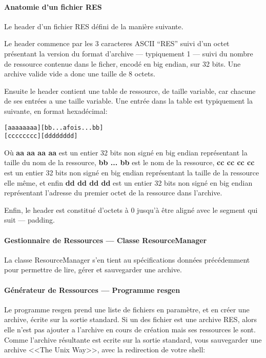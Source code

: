 \documentclass[11pt, a4paper, titlepage]{article}
\begin{document}
\paragraph{Anatomie d'un fichier RES\\}

Le header d'un fichier RES défini de la manière suivante.

Le header commence par les 3 caracteres ASCII ``RES'' suivi d'un octet présentant la version du format d'archive --- typiquement 1 --- suivi du nombre de
ressource contenue dans le ficher, encodé en big endian, sur 32 bits.
Une archive valide vide a donc une taille de 8 octets.

Ensuite le header contient une table de ressource, de taille variable, car chacune de ses entrées a une taille variable.
Une entrée dans la table est typiquement la suivante, en format hexadécimal:

\begin{alltt}
[ aa aa aa aa ] [ bb {... a fois ...} bb]
[ cc cc cc cc ] [ dd dd dd dd ]
\end{alltt}

Où \textbf{aa aa aa aa} est un entier 32 bits non signé en big endian représentant la taille du nom de la ressource, \textbf{bb ... bb} est le nom de la ressource,
\textbf{cc cc cc cc} est un entier 32 bits non signé en big endian représentant la taille de la ressource elle même, et enfin \textbf{dd dd dd dd} est
un entier 32 bits non signé en big endian représentant l'adresse du premier octet de la ressource dans l'archive.

Enfin, le header est constitué d'octets à 0 jusqu'à être aligné avec le segment qui suit --- padding.

\paragraph{Gestionnaire de Ressources --- Classe ResourceManager\\}

La classe ResourceManager s'en tient au spécifications données précédemment pour permettre de lire, gérer et sauvegarder une archive. 

\paragraph{Générateur de Ressources  --- Programme resgen\\}

Le programme resgen prend une liste de fichiers en paramètre, et en créer une archive, écrite sur la sortie standard.
Si un des fichier est une archive RES, alors elle n'est pas ajouter a l'archive en cours de création mais ses ressources le sont.
Comme l'archive résultante est ecrite sur la sortie standard, vous sauvegarder une archive <<The Unix Way>>, avec la redirection de votre shell:
 
\end{document}
